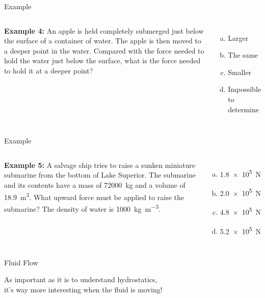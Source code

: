 \documentclass[12pt,aspectratio=169]{beamer}
\begin{document}
\begin{frame}{Example}
  \begin{columns}
    \textbf{Example 4:} An apple is held completely submerged just below the
    surface of a container of water. The apple is then moved to a deeper point
    in the water. Compared with the force needed to hold the water just below
    the surface, what is the force needed to hold it at a deeper point?
    \begin{enumerate}[(a)]
    \item Larger
    \item The same
    \item Smaller
    \item Impossible to determine
    \end{enumerate}

  \end{columns}
\end{frame}



\begin{frame}{Example}
  \begin{columns}

    \textbf{Example 5:} A salvage ship tries to raise a sunken miniature
    submarine from the bottom of Lake Superior. The submarine and its contents
    have a mass of \SI{72000}{\kilo\gram} and a volume of
    \SI{18.9}{\metre\cubed}.
    What upward force must be applied to raise the submarine? The density of
    water is \SI{1000}{\kilo\gram\per\metre\cubed}.
    \begin{enumerate}[(a)]
    \item\SI{1.8e5}\newton
    \item\SI{2.0e5}\newton
    \item\SI{4.8e5}\newton
    \item\SI{5.2e5}\newton
    \end{enumerate}
  \end{columns}
\end{frame}



\begin{frame}{Fluid Flow}
  \begin{center}
    As important as it is to understand hydrostatics,\\
    it's way more interesting when the fluid is moving!
  \end{center}
\end{frame}
\end{document}
